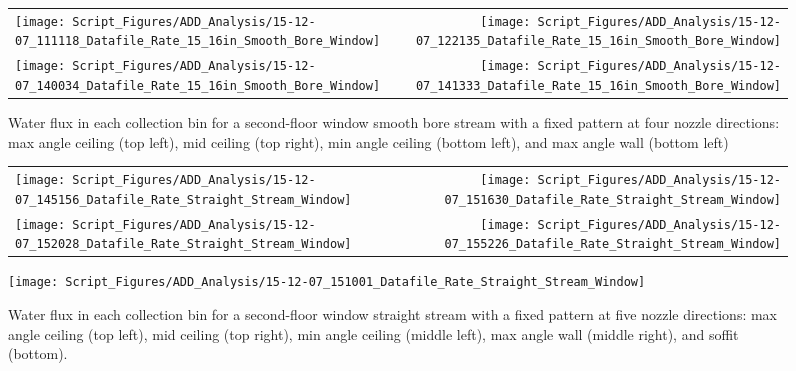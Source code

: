 \documentclass[12pt,oneside]{book}
\begin{document}
\begin{figure}[ht]
\begin{tabular*}{\textwidth}{lr}
\texttt{[image: Script\_Figures/ADD\_Analysis/15-12-07\_111118\_Datafile\_Rate\_15\_16in\_Smooth\_Bore\_Window]} &
\texttt{[image: Script\_Figures/ADD\_Analysis/15-12-07\_122135\_Datafile\_Rate\_15\_16in\_Smooth\_Bore\_Window]} \\
\texttt{[image: Script\_Figures/ADD\_Analysis/15-12-07\_140034\_Datafile\_Rate\_15\_16in\_Smooth\_Bore\_Window]} &
\texttt{[image: Script\_Figures/ADD\_Analysis/15-12-07\_141333\_Datafile\_Rate\_15\_16in\_Smooth\_Bore\_Window]} \\
\end{tabular*}
\caption[Water Flux for Varying Nozzle Direction with Fixed Second Floor Window Smooth Bore Stream]{Water flux in each collection bin for a second-floor window smooth bore stream with a fixed pattern at four nozzle directions: max angle ceiling (top left), mid ceiling (top right), min angle ceiling (bottom left), and max angle wall (bottom left)}
\label{fig:Window_Second_Floor_Varying_Nozzle_Directions_SB_Fixed_Pattern}
\end{figure}

\begin{figure}[ht]
\begin{tabular*}{\textwidth}{lr}
\texttt{[image: Script\_Figures/ADD\_Analysis/15-12-07\_145156\_Datafile\_Rate\_Straight\_Stream\_Window]} &
\texttt{[image: Script\_Figures/ADD\_Analysis/15-12-07\_151630\_Datafile\_Rate\_Straight\_Stream\_Window]} \\
\texttt{[image: Script\_Figures/ADD\_Analysis/15-12-07\_152028\_Datafile\_Rate\_Straight\_Stream\_Window]} &
\texttt{[image: Script\_Figures/ADD\_Analysis/15-12-07\_155226\_Datafile\_Rate\_Straight\_Stream\_Window]} \\
\end{tabular*}
\centering
\texttt{[image: Script\_Figures/ADD\_Analysis/15-12-07\_151001\_Datafile\_Rate\_Straight\_Stream\_Window]}
\caption[Water Flux for Varying Nozzle Direction with Fixed Second Floor Window Straight Stream]{Water flux in each collection bin for a second-floor window straight stream with a fixed pattern at five nozzle directions: max angle ceiling (top left), mid ceiling (top right), min angle ceiling (middle left), max angle wall (middle right), and soffit (bottom).}
\label{fig:Window_Second_Floor_Varying_Nozzle_Directions_SS_Fixed_Pattern}
\end{figure}
\end{document}
